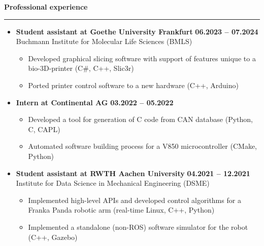 \documentclass[12pt]{article} %
\newcommand{\HighlightedText}[1] {{\textbf{#1}}}
\newcommand{\PlaceAndTime}[2] {\HighlightedText{#1} \hfill \HighlightedText{#2}}
\newenvironment{ItemizeSection}[1]{
    \vspace{1mm}
    \HighlightedText{#1}
    \vspace{0.5mm}
    {\color{custom_blue} \hrule}
    \begin{itemize}[left=0.5em, topsep=0pt, itemsep=0pt, label={$\bullet$}]
}{
    \end{itemize}
}
\newenvironment{ItemizeSubsection}{
    \begin{itemize}[left=0.5em, topsep=-999pt, itemsep=0pt, label={$\circ$}]
}{
    \end{itemize}
}
\begin{document}
\begin{ItemizeSection}{Professional experience}
    \item \PlaceAndTime{Student assistant at Goethe University Frankfurt}{06.2023 -- 07.2024} \\
    Buchmann Institute for Molecular Life Sciences (BMLS)
    \begin{ItemizeSubsection}
        \item Developed graphical slicing software with support of features unique to a bio-3D-printer (C\#, C++, Slic3r)
        \item Ported printer control software to a new hardware (C++, Arduino)
    \end{ItemizeSubsection}

    \item \PlaceAndTime{Intern at Continental AG}{03.2022 -- 05.2022}
    \begin{ItemizeSubsection}
        \item Developed a tool for generation of C code from CAN database (Python, C, CAPL)
        \item Automated software building process for a V850 microcontroller (CMake, Python)
    \end{ItemizeSubsection}

    \item \PlaceAndTime{Student assistant at RWTH Aachen University}{04.2021 -- 12.2021} \\
    Institute for Data Science in Mechanical Engineering (DSME)
    \begin{ItemizeSubsection}
        \item Implemented high-level APIs and developed control algorithms for a Franka Panda robotic arm (real-time Linux, C++, Python)
        \item Implemented a standalone (non-ROS) software simulator for the robot (C++, Gazebo)
    \end{ItemizeSubsection}
\end{ItemizeSection}
\end{document}
